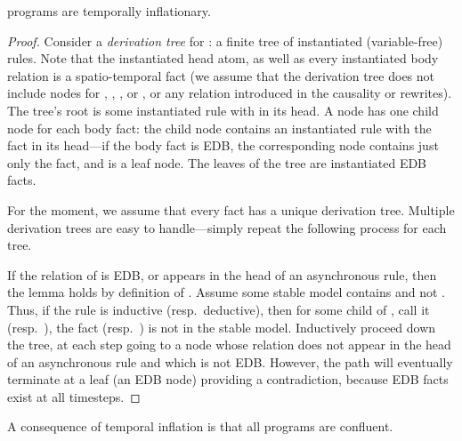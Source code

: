 \begin{lemma}
\label{lem:inflationary}
\slang programs are temporally inflationary.
\end{lemma}
\begin{proof}
Consider a {\em derivation tree} for : a finite tree of instantiated (variable-free) rules.  Note that the instantiated head atom, as well as every instantiated body relation is a spatio-temporal fact (we assume that the derivation tree does not include nodes for , , , or \dedalus{<}, or any relation introduced in the causality or  rewrites).  The tree's root is some instantiated rule with  in its head.  A node has one child node for each body fact: the child node contains an instantiated rule with the fact in its head---if the body fact is EDB, the corresponding node contains just only the fact, and is a leaf node.  The leaves of the tree are instantiated EDB facts.

For the moment, we assume that every fact has a unique derivation tree.  Multiple derivation trees are easy to handle---simply repeat the following process for each tree.

If the relation of  is EDB, or appears in the head of an asynchronous rule, then the lemma holds by definition of \slang.  Assume some stable model contains  and not .  Thus, if the rule is inductive (resp.\ deductive), then for some child of , call it  (resp.\ ), the fact  (resp.\ ) is not in the stable model.  Inductively proceed down the tree, at each step going to a node whose relation does not appear in the head of an asynchronous rule and which is not EDB.  However, the path will eventually terminate at a leaf (an EDB node) providing a contradiction, because EDB facts exist at all timesteps.
\end{proof}

A consequence of temporal inflation is that all \slang programs are confluent.

